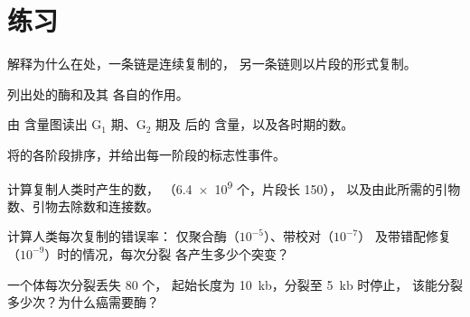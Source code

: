 \section{练习}

\begin{exercise}[$\star$]\label{exo:b1:replication-mitosis:1}
解释为什么在处，一条链是连续复制的，
另一条链则以片段的形式复制。
\end{exercise}

\begin{exercise}[$\star$]\label{exo:b1:replication-mitosis:2}
列出处的酶和及其
各自的作用。
\end{exercise}

\begin{exercise}[$\star$]\label{exo:b1:replication-mitosis:3}
由  含量图读出 G$_1$ 期、G$_2$ 期及
后的  含量，以及各时期的数。
\end{exercise}

\begin{exercise}[$\star$]\label{exo:b1:replication-mitosis:4}
将的各阶段排序，并给出每一阶段的标志性事件。
\end{exercise}

\begin{exercise}[$\star\star$]\label{exo:b1:replication-mitosis:5}
计算复制人类时产生的数，
（\num{6.4e9} 个，片段长 \qty{150}{}），
以及由此所需的引物数、引物去除数和连接数。
\end{exercise}

\begin{exercise}[$\star\star$]\label{exo:b1:replication-mitosis:6}
计算人类每次复制的错误率：
仅聚合酶（$10^{-5}$）、带校对（$10^{-7}$）
及带错配修复（$10^{-9}$）时的情况，每次分裂
各产生多少个突变？
\end{exercise}

\begin{exercise}[$\star\star$]\label{exo:b1:replication-mitosis:7}
一个体每次分裂丢失 \qty{80}{} 个，
起始长度为 \qty{10}{kb}，分裂至 \qty{5}{kb} 时停止，
该能分裂多少次？为什么癌需要酶？
\end{exercise}

